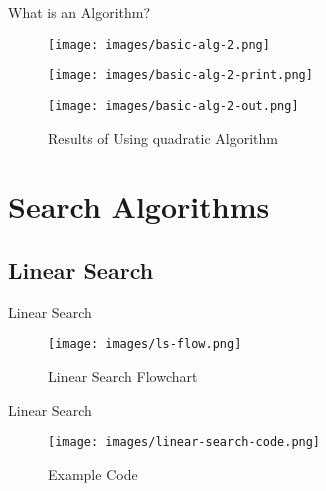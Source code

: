 \documentclass[aspectratio=169]{beamer}
\begin{document}
\begin{frame}{What is an Algorithm?} \pause
    \begin{figure}
        \begin{minipage}{\textwidth}
            \begin{minipage}{0.5\textwidth}
                \centering
                \texttt{[image: images/basic-alg-2.png]}
                \caption{More Complex Quadratic Algorithm} \pause
            \end{minipage}%
            \begin{minipage}{0.5\textwidth}
                \centering
                \texttt{[image: images/basic-alg-2-print.png]}
                \caption{Print Statements} \pause
            \end{minipage}
        \end{minipage}
        \begin{minipage}{0.5\textwidth}
            \centering
            \texttt{[image: images/basic-alg-2-out.png]}
            \caption{Results of Using quadratic Algorithm}
        \end{minipage}
    \end{figure}
\end{frame}

\section{Search Algorithms}

\subsection{Linear Search}

\begin{frame}{Linear Search} \pause
    \begin{figure}
        \begin{center}
            \texttt{[image: images/ls-flow.png]}
            \caption{Linear Search Flowchart}
        \end{center}
    \end{figure}
\end{frame}

\begin{frame}{Linear Search}
    \begin{figure}
        \texttt{[image: images/linear-search-code.png]}
        \caption{Example Code}
    \end{figure}
\end{frame}
\end{document}
